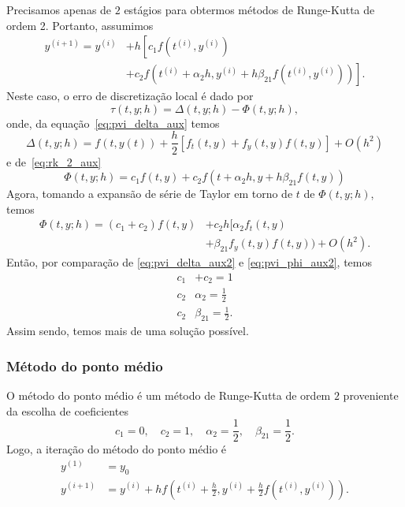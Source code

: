 Precisamos apenas de $2$ estágios para obtermos métodos de Runge-Kutta de ordem 2. Portanto, assumimos
\begin{align}
  y^{(i+1)} = y^{(i)} &+ h\left[c_1f(t^{(i)},y^{(i)}) \right.\nonumber\\
  &\left. + c_2f(t^{(i)}+\alpha_2h,y^{(i)}+h\beta_{21}f(t^{(i)},y^{(i)}))\right].\label{eq:rk_2_aux}
\end{align}
Neste caso, o erro de discretização local é dado por
\begin{equation}
  \tau(t,y;h) = \Delta(t,y;h) - \Phi(t,y;h),
\end{equation}
onde, da equação~\eqref{eq:pvi_delta_aux} temos
\begin{equation}\label{eq:pvi_delta_aux2}
  \Delta(t,y;h) = f(t,y(t)) + \frac{h}{2}[f_t(t,y) + f_y(t,y)f(t,y)] + O(h^2)
\end{equation}
e de~\eqref{eq:rk_2_aux}
\begin{equation}
  \Phi(t,y;h) = c_1f(t,y) + c_2f(t+\alpha_2h,y+h\beta_{21}f(t,y))
\end{equation}
Agora, tomando a expansão de série de Taylor em torno de $t$ de $\Phi(t,y;h)$, temos
\begin{align}\label{eq:pvi_phi_aux2}
  \Phi(t,y;h) = (c_1+c_2)f(t,y) &+ c_2h[\alpha_2f_t(t,y) \nonumber\\
  &+\beta_{21}f_y(t,y)f(t,y)) + O(h^2).
\end{align}
Então, por comparação de \eqref{eq:pvi_delta_aux2} e \eqref{eq:pvi_phi_aux2}, temos
\begin{align}
  c_1&+c_2 = 1\\
  c_2&\alpha_2 = \frac{1}{2}\\
  c_2&\beta_{21} = \frac{1}{2}.
\end{align}
Assim sendo, temos mais de uma solução possível.

\subsubsection{Método do ponto médio}

O método do ponto médio é um método de Runge-Kutta de ordem $2$ proveniente da escolha de coeficientes
\begin{equation}
  c_1 = 0, \quad c_2 = 1, \quad \alpha_2 = \frac{1}{2},\quad \beta_{21}=\frac{1}{2}.
\end{equation}
Logo, a iteração do método do ponto médio é
\begin{align}
  y^{(1)} &= y_0\\
  y^{(i+1)} &= y^{(i)} + hf\left(t^{(i)}+\frac{h}{2},y^{(i)}+\frac{h}{2}f(t^{(i)},y^{(i)})\right).
\end{align}

